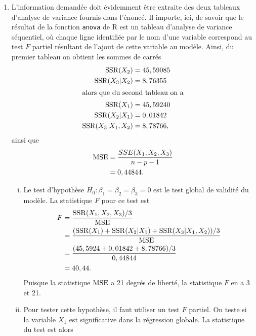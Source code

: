 \begin{solution}{3.11}
    \begin{enumerate}
    \item L'information demandée doit évidemment être extraite des
      deux tableaux d'analyse de variance fournis dans l'énoncé. Il
      importe, ici, de savoir que le résultat de la fonction
      \texttt{anova} de \textsf{R} est un tableau d'analyse de
      variance séquentiel, où chaque ligne identifiée par le nom d'une
      variable correspond au test $F$ partiel résultant de l'ajout de
      cette variable au modèle. Ainsi, du premier tableau on obtient
      les sommes de carrés
      \begin{align*}
        \mathrm{SSR}(X_2)          &= 45,59085 \\
        \mathrm{SSR}(X_3|X_2)      &= 8,76355 \\
        \intertext{alors que du second tableau on a}
        \mathrm{SSR}(X_1)          &= 45,59240 \\
        \mathrm{SSR}(X_2|X_1)      &= 0,01842 \\
        \mathrm{SSR}(X_3|X_1, X_2) &= 8,78766,
      \end{align*}
      ainsi que
      \begin{align*}
        \mathrm{MSE}
        &= \frac{SSE(X_1, X_2, X_3)}{n - p - 1} \\
        &= 0,44844.
      \end{align*}
      \begin{enumerate}[i)]
      \item Le test d'hypothèse $H_0: \beta_1 = \beta_2 = \beta_3 = 0$
        est le test global de validité du modèle. La statistique $F$
        pour ce test est
        \begin{align*}
          F
          &= \frac{\mathrm{SSR}(X_1, X_2, X_3)/3}{\mathrm{MSE}} \\
          &= \frac{(\mathrm{SSR}(X_1) + \mathrm{SSR}(X_2|X_1) + \mathrm{SSR}(X_3|X_1,X_2))/3}{\mathrm{MSE}} \\
          &= \frac{(45,5924 + 0,01842 + 8,78766)/3}{0,44844} \\
          &= 40,44.
        \end{align*}
        Puisque la statistique $\mathrm{MSE}$ a 21 degrés de liberté, la
        statistique $F$ en a 3 et 21.
      \item Pour tester cette hypothèse, il faut utiliser un test $F$
        partiel. On teste si la variable $X_1$ est significative dans
        la régression globale. La statistique du test est alors
        \begin{align*}

\end{align*}
\end{enumerate}
\end{enumerate}
\end{solution}
